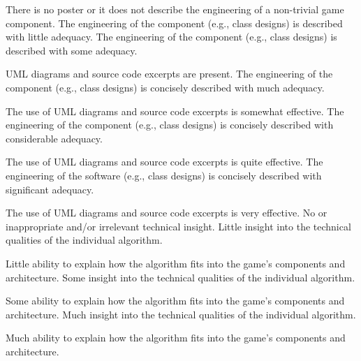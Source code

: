 \documentclass{../../fal_assignment}
\begin{document}
\begin{markingrubric}
%
        \grade\fail There is no poster or it does not describe the engineering of a non-trivial game component. 
        \grade The engineering of the component (e.g., class designs) is described with little adequacy.
        \grade The engineering of the component (e.g., class designs) is described with some adequacy.
            \par UML diagrams and source code excerpts are present.
        \grade The engineering of the component (e.g., class designs) is concisely described with much adequacy.
            \par The use of UML diagrams and source code excerpts is somewhat effective.
        \grade The engineering of the component (e.g., class designs) is concisely described with considerable adequacy.
            \par The use of UML diagrams and source code excerpts is quite effective.
        \grade The engineering of the software (e.g., class designs) is concisely described with significant adequacy.
            \par The use of UML diagrams and source code excerpts is very effective.
%
        \grade\fail No or inappropriate and/or irrelevant technical insight.
        \grade Little insight into the technical qualities of the individual algorithm.
            \par Little ability to explain how the algorithm fits into the game's components and architecture.
        \grade Some insight into the technical qualities of the individual algorithm.
            \par Some ability to explain how the algorithm fits into the game's components and architecture.
        \grade Much insight into the technical qualities of the individual algorithm.
            \par Much ability to explain how the algorithm fits into the game's components and architecture.

\end{markingrubric}
\end{document}
